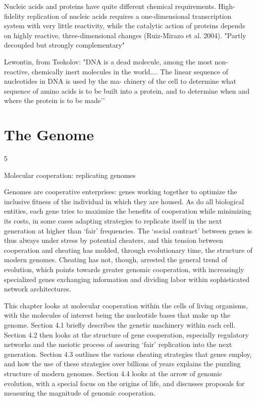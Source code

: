 \documentclass{tufte-book} %
\begin{document}
Nucleic acids and proteins have quite different chemical requirements. High-fidelity replication of nucleic acids requires a one-dimensional transcription system with very little reactivity, while the catalytic action of proteins depends on highly reactive, three-dimensional changes (Ruiz-Mirazo et al. 2004). "Partly decoupled but strongly complementary"

Lewontin, from Tsokolov: "DNA is a dead molecule, among the most non- reactive, chemically inert molecules in the world.... The linear sequence of nucleotides in DNA is used by the ma- chinery of the cell to determine what sequence of amino acids is to be built into a protein, and to determine when and where the protein is to be made’’





\chapter{The Genome}\label{ch:genome}

5

Molecular cooperation: replicating genomes


Genomes are cooperative enterprises: genes working together to optimize the inclusive fitness of the individual in which they are housed. As do all biological entities, each gene tries to maximize the benefits of cooperation while minimizing its costs, in some cases adapting strategies to replicate itself in the next generation at higher than ‘fair’ frequencies. The ‘social contract’ between genes is thus always under stress by potential cheaters, and this tension between cooperation and cheating has molded, through evolutionary time, the structure of modern genomes. Cheating has not, though, arrested the general trend of evolution, which points towards greater genomic cooperation, with increasingly specialized genes exchanging information and dividing labor within sophisticated network architectures.

This chapter looks at molecular cooperation within the cells of living organisms, with the molecules of interest being the nucleotide bases that make up the genome. Section 4.1 briefly describes the genetic machinery within each cell. Section 4.2 then looks at the structure of gene cooperation, especially regulatory networks and the meiotic process of assuring ‘fair’ replication into the next generation. Section 4.3 outlines the various cheating strategies that genes employ, and how the use of these strategies over billions of years explains the puzzling structure of modern genomes. Section 4.4 looks at the arrow of genomic evolution, with a special focus on the origins of life, and discusses proposals for measuring the magnitude of genomic cooperation.
\end{document}
